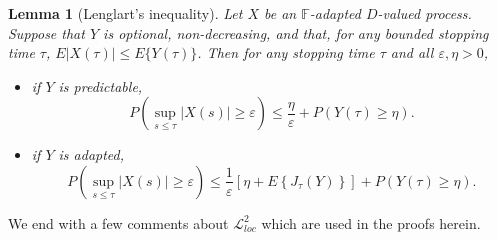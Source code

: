 \documentclass[final]{amsart}
\newtheorem{lem}[thm]{Lemma}
\theoremstyle{definition}
\numberwithin{equation}{section}
\newcommand{\dF}{\ensuremath{\mathbb{F}}}
\newcommand{\cL}{\ensuremath{\mathcal{L}}}
\begin{document}
\begin{lem}[Lenglart's inequality]\label{lem:lenglart}
Let $X$ be an $\dF$-adapted $D$-valued process. Suppose that $Y$ is optional, non-decreasing,
and that, for any bounded stopping time $\tau$, $E|X(\tau)|\leq E\{Y(\tau)\}$.
Then for any stopping time $\tau$ and all $\varepsilon,\eta >0$,
\begin{itemize}
\item[{a)}]
if $Y$ is predictable,
\begin{equation}\label{eng1}
P(\sup_{s\leq \tau}|X(s)|\geq\varepsilon) \leq \frac{\eta}{\varepsilon} +
P(Y(\tau)\geq\eta).
\end{equation}

\item[b)]
if $Y$ is adapted,
\begin{equation}\label{eng2}
P(\sup_{s\leq \tau}|X(s)|\geq\varepsilon) \leq \frac{1}{\varepsilon}
\left[\eta+ E\left\{J_\tau(Y) \right\}\right] +
P(Y(\tau)\geq\eta).
\end{equation}
\end{itemize}
\end{lem}


We end with a few comments about $\cL^2_{loc}$ which are used in the proofs herein.
\end{document}
